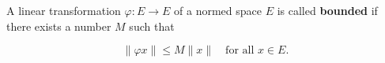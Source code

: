 A linear transformation $\varphi: E \to E$ of a normed space $E$ is called \textbf{bounded} if there exists a number $M$ such that

$$\|\varphi x\| \leq M \|x\| \quad \text{for all } x \in E.$$
